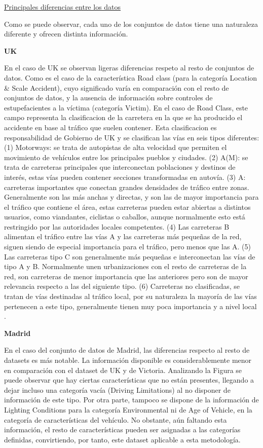 \documentclass{uathesis-es}
\begin{document}
{	
	\underline{Principales diferencias entre los datos}
	
	Como se puede observar, cada uno de los conjuntos de datos tiene una naturaleza diferente y ofrecen distinta información.
	
	\textbf{UK}
	
	En el caso de UK se observan ligeras diferencias respeto al resto de conjuntos de datos. Como es el caso de la característica Road class (para la categoría Location \& Scale Accident), cuyo significado varía en comparación con el resto de conjuntos de datos, y la ausencia de información sobre controles de estupefacientes a la víctima (categoría Victim). En el caso de Road Class, este campo representa la clasificacion de la carretera en la que se ha producido el accidente en base al tráfico que suelen contener. Esta clasificacion es responsabilidad de Gobierno de UK y se clasifican las vías en seis tipos diferentes: (1) Motorways: se trata de autopistas de alta velocidad que permiten el movimiento de vehículos entre los principales pueblos y ciudades. (2) A(M): se trata de carreteras principales que interconectan poblaciones y destinos de interés, estas vías pueden contener secciones transformadas en autovía. (3) A: carreteras importantes que conectan grandes densidades de tráfico entre zonas. Generalmente son las más anchas y directas, y son las de mayor importancia para el tráfico que contiene el área, estas carreteras pueden estar abiertas a distintos usuarios, como viandantes, ciclistas o caballos, aunque normalmente esto está restringido por las autoridades locales competentes. (4) Las carreteras B alimentan el tráfico entre las vías A y las carreteras más pequeñas de la red, siguen siendo de especial importancia para el tráfico, pero menos que las A. (5) Las carreteras tipo C son generalmente más pequeñas e interconectan las vías de tipo A y B. Normalmente unen urbanizaciones con el resto de carreteras de la red, son carreteras de menor importancia que las anteriores pero son de mayor relevancia respecto a las del siguiente tipo. (6) Carreteras no clasificadas, se tratan de vías destinadas al tráfico local, por su naturaleza la mayoría de las vías pertenecen a este tipo, generalmente tienen muy poca importancia y a nivel local \cite{UKDepartmentForTransportRoadClassification}.
	
	
	\textbf{Madrid}
	
	En el caso del conjunto de datos de Madrid, las diferencias respecto al resto de datasets es más notable. La información disponible es considerablemente menor en comparación con el dataset de UK y de Victoria. Analizando la Figura se puede observar que hay ciertas características que no están presentes, llegando a dejar incluso una categoría vacía (Driving Limitations) al no disponer de información de este tipo. Por otra parte, tampoco se dispone de la información de Lighting Conditions para la categoría Environmental ni de Age of Vehicle, en la categoría de características del vehículo. No obstante, aún faltando esta información, el resto de características pueden ser asignadas a las categorías definidas, convirtiendo, por tanto, este dataset aplicable a esta metodología.
	
}
\end{document}
